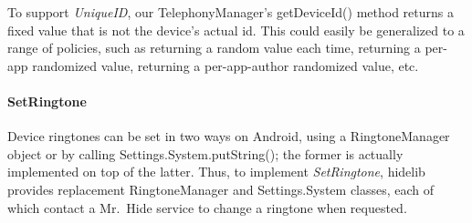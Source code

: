\documentclass[preprint]{sig-alternate-10pt}
\newcommand{\code}[1]{\textsf{#1}}
\newcommand{\lib}{Mr.\ Hide\xspace}
\newcommand{\perm}[1]{\textsf{\textit{#1}}}
\newcommand{\polLocationBlockName}{\perm{LocationBlock}\xspace}
\begin{document}
To support \perm{UniqueID}, our \code{TelephonyManager}'s
\code{getDeviceId()} method returns a fixed value that is not the
device's actual id. This could easily be generalized to a range of
policies, such as returning a random value each time, returning a
per-app randomized value, returning a per-app-author randomized value,
etc.



\paragraph*{SetRingtone}

Device ringtones can be set in two ways on Android, using a
\code{RingtoneManager} object or by calling
\code{Settings.System.putString()}; the former
is actually implemented on top of the latter.
Thus, to implement \perm{SetRingtone}, \code{hidelib}
provides replacement \code{RingtoneManager} and
\code{Settings.System} classes, each of which contact a \lib service
to change a ringtone when requested. 
\end{document}
